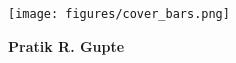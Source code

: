 
\begin{titlepage}
    \pagecolor{myOrange}\afterpage{\nopagecolor}
    \begin{addmargin}[-1cm]{-3cm}
        \linespread{1.5}

        \hfill

        {
          \begin{flushleft}
            \par
          \end{flushleft}
        }
        \texttt{[image: figures/cover\_bars.png]}
        \vspace{81mm}

        {\color{SteelBlue4}\bfseries\huge{Pratik R. Gupte}}

        \vfill

        \vfill

  \end{addmargin}
\end{titlepage}

\nopagecolor
